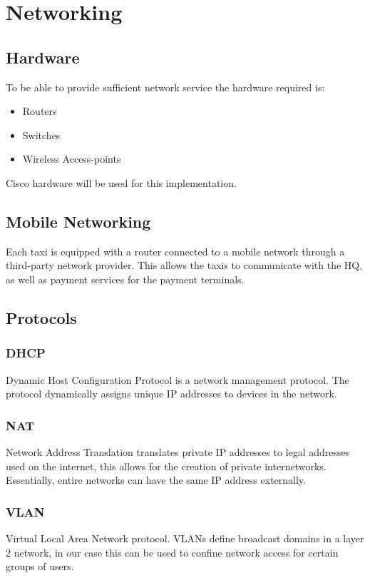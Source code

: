 \section{Networking}
\subsection{Hardware}
To be able to provide sufficient network service the hardware required is:
    \begin{itemize}[noitemsep]  
        \item Routers
        \item Switches
        \item Wireless Access-points
    \end{itemize}
Cisco hardware will be used for this implementation.    


\subsection{Mobile Networking}
Each taxi is equipped with a router connected to a mobile network through a third-party network provider.
This allows the taxis to communicate with the HQ, as well as payment services for the payment terminals.

\subsection{Protocols}

\subsubsection{DHCP}
Dynamic Host Configuration Protocol is a network management protocol.
The protocol dynamically assigns unique IP addresses to devices in the network.

\subsubsection{NAT}
Network Address Translation translates private IP addresses to legal addresses used on the internet, this allows for the creation of private internetworks. 
Essentially, entire networks can have the same IP address externally.

\subsubsection{VLAN}
Virtual Local Area Network protocol.
VLANs define broadcast domains in a layer 2 network, \cite{VLAN} in our case this can be used to confine network access for certain groups of users.


